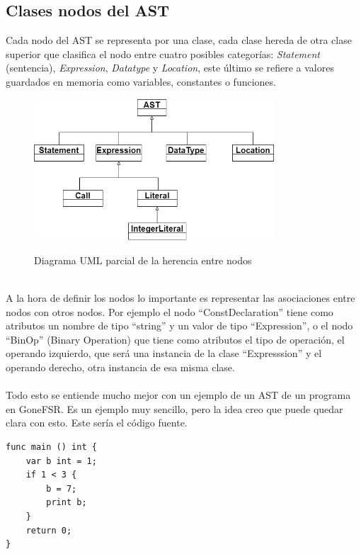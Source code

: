 \subsection{Clases nodos del AST}
Cada nodo del AST se representa por una clase, cada clase hereda de otra clase superior que clasifica el nodo entre cuatro posibles categorías: \textit{Statement} (sentencia), \textit{Expression}, \textit{Datatype} y \textit{Location}, este último se refiere a valores guardados en memoria como variables, constantes o funciones.
\begin{figure}[h] 
    \centering
    \includegraphics[width=0.8\textwidth,keepaspectratio]{img/astuml.png}
    \parbox{\linewidth}{\centering Diagrama UML parcial de la herencia entre nodos}
    \label{fig:mi_imagen}
\end{figure}\\
A la hora de definir los nodos lo importante es representar las asociaciones entre nodos con otros nodos. Por ejemplo el nodo ``ConstDeclaration'' tiene como atributos un nombre de tipo ``string'' y un valor de tipo ``Expression'', o el nodo ``BinOp'' (Binary Operation) que tiene como atributos el tipo de operación, el operando izquierdo, que será una instancia de la clase ``Expresssion'' y el operando derecho, otra instancia de esa misma clase.\\\\ 
Todo esto se entiende mucho mejor con un ejemplo de un AST de un programa en GoneFSR. Es un ejemplo muy sencillo, pero la idea creo que puede quedar clara con esto. Este sería el código fuente.

\begin{lstlisting}[style=goneStyle]
func main () int {
    var b int = 1;
    if 1 < 3 {
        b = 7;
        print b;
    }
    return 0;
}
\end{lstlisting}


